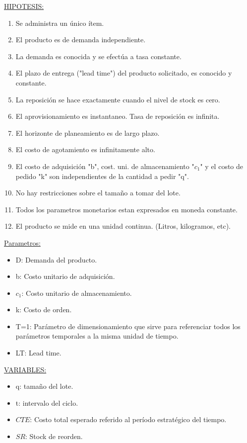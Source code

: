 \documentclass{article}
\begin{document}
\underline{HIPOTESIS:}
\begin{enumerate}
    \item Se administra un único ítem.
    \item El producto es de demanda independiente.
    \item La demanda es conocida y se efectúa a tasa constante.
    \item El plazo de entrega ("lead time") del producto solicitado, es conocido y constante.
    \item La reposición se hace exactamente cuando el nivel de stock es cero.
    \item El aprovisionamiento es instantaneo. Tasa de reposición es infinita.
    \item El horizonte de planeamiento es de largo plazo.
    \item El costo de agotamiento es infinitamente alto.
    \item El costo de adquisición "b", cost. uni. de almacenamiento "\(c_1\)" y el costo de pedido "k" son independientes de la cantidad a pedir "q".
    \item No hay restricciones sobre el tamaño a tomar del lote.
    \item Todos los parametros monetarios estan expresados en moneda constante.
    \item El producto se mide en una unidad continua. (Litros, kilogramos, etc).
\end{enumerate}

\underline{Parametros:}
\begin{itemize}
    \item D: Demanda del producto.
    \item b: Costo unitario de adquisición.
    \item \(c_1\):  Costo unitario de almacenamiento.
    \item k: Costo de orden.
    \item T=1: Parámetro de dimensionamiento que sirve para referenciar todos los parámetros temporales a la misma unidad de tiempo.
    \item LT: Lead time.
\end{itemize}

\underline{VARIABLES:}
\begin{itemize}
    \item q: tamaño del lote.
    \item t: intervalo del ciclo.
    \item \(CTE\): Costo total esperado referido al período estratégico del tiempo.
    \item \(SR\): Stock de reorden.
\end{itemize}
\end{document}
